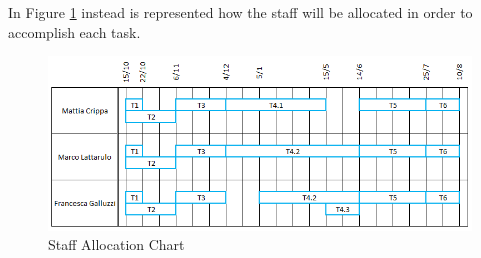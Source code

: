 \noindent In Figure \ref{fig:staffalloc} instead is represented how the staff will be allocated in order to accomplish each task.

\begin{figure}[!htbp]
\centering
\includegraphics[width=\textwidth]{cpt/img/StaffAlloc}
\caption{Staff Allocation Chart}
\label{fig:staffalloc}
\end{figure}